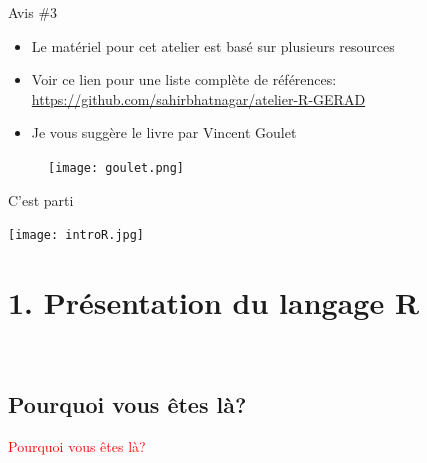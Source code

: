 \documentclass[11pt]{beamer}\usepackage[]{graphicx}\usepackage[]{color}
\begin{document}
\begin{frame}{Avis \#3}

\begin{itemize}
\item Le mat\'{e}riel pour cet atelier est bas\'{e} sur plusieurs resources
\item Voir ce lien pour une liste compl\`{e}te de r\'{e}f\'{e}rences: \href{https://github.com/sahirbhatnagar/atelier-R-GERAD}{https://github.com/sahirbhatnagar/atelier-R-GERAD}
\item Je vous sugg\`{e}re le livre par Vincent Goulet
\end{itemize}


\begin{figure}
\texttt{[image: goulet.png]}
\end{figure}


\end{frame}


\begin{frame}[plain]{C'est parti}
\hspace*{-1.5cm}\parbox[t]{\textwidth}{
\begin{center}
\texttt{[image: introR.jpg]}
\end{center}
}
\end{frame}



\section{1. Pr\'{e}sentation du langage R}

\begin{frame}[plain]
\hspace*{-1.0cm}\parbox[t]{\textwidth}{
 \begin{center}
  \Huge{\textcolor{white}{1. Pr\'{e}sentation du langage R}}
 \end{center}
 }
\end{frame}

\subsection{Pourquoi vous \^{e}tes l\`{a}?}

\begin{frame}
 \begin{center}
  \Huge{\textcolor{red}{Pourquoi vous \^{e}tes l\`{a}?}}
 \end{center}
\end{frame}
\end{document}
